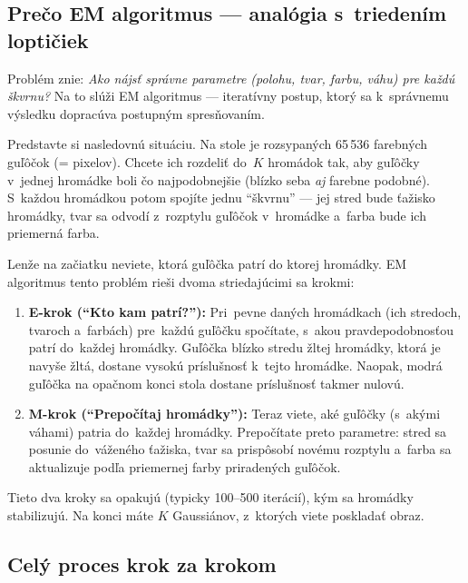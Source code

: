 \documentclass[a4paper,11pt]{article}
\begin{document}
\subsection{Prečo EM algoritmus --- analógia s~triedením loptičiek}

Problém znie: \emph{Ako nájsť správne parametre (polohu, tvar, farbu,
váhu) pre každú škvrnu?}  Na to slúži EM algoritmus --- iteratívny
postup, ktorý sa k~správnemu výsledku dopracúva postupným
spresňovaním.

Predstavte si nasledovnú situáciu.  Na stole je rozsypaných
65\,536 farebných guľôčok (= pixelov).  Chcete ich rozdeliť do~$K$
hromádok tak, aby guľôčky v~jednej hromádke boli čo najpodobnejšie
(blízko seba \emph{aj} farebne podobné).  S~každou hromádkou potom
spojíte jednu ``škvrnu'' --- jej stred bude ťažisko hromádky, tvar
sa odvodí z~rozptylu guľôčok v~hromádke a~farba bude ich priemerná
farba.

Lenže na začiatku neviete, ktorá guľôčka patrí do ktorej hromádky.
EM algoritmus tento problém rieši dvoma striedajúcimi sa krokmi:

\begin{enumerate}
  \item \textbf{E-krok (``Kto kam patrí?''):}
        Pri~pevne daných hromádkach (ich stredoch, tvaroch a~farbách)
        pre~každú guľôčku spočítate, s~akou pravdepodobnosťou patrí
        do~každej hromádky.  Guľôčka blízko stredu žltej hromádky, ktorá
        je navyše žltá, dostane vysokú príslušnosť k~tejto hromádke.
        Naopak, modrá guľôčka na opačnom konci stola dostane príslušnosť
        takmer nulovú.

  \item \textbf{M-krok (``Prepočítaj hromádky''):}
        Teraz viete, aké guľôčky (s~akými váhami) patria do~každej
        hromádky.  Prepočítate preto parametre: stred sa posunie
        do~váženého ťažiska, tvar sa prispôsobí novému rozptylu
        a~farba sa aktualizuje podľa priemernej farby priradených
        guľôčok.
\end{enumerate}

\noindent
Tieto dva kroky sa opakujú (typicky 100--500 iterácií), kým sa
hromádky stabilizujú.  Na konci máte $K$ Gaussiánov, z~ktorých
viete poskladať obraz.

\subsection{Celý proces krok za krokom}
\end{document}
